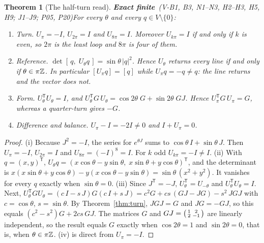 \documentclass[11pt,a4paper]{article}
\newcommand{\tp}{^{\mathsf T}}
\newcommand{\st}[1]{\textsf{\small\textbf{#1}}}
\newcommand{\Sfin}{\st{Exact finite}}\newcommand{\Sder}{\st{Exact derived}}
\theoremstyle{plain}
\newtheorem{thm}{Theorem}[section]
\theoremstyle{definition}
\theoremstyle{remark}
\begin{document}
\begin{thm}[The half-turn read]\Sfin\ \textit{(V-B1, B3, N1--N3, H2--H3, H5, H9; J1--J9; P05, P20)}\label{thm:endure}
For every $\theta$ and every $q\in V\setminus\{0\}$:
\begin{enumerate}[label=(\roman*),nosep]
\item \emph{Turn.} $U_\pi=-I$, $U_{2\pi}=I$ and $U_{8\pi}=I$. Moreover $U_{k\pi}=I$ if and only if $k$ is even, so $2\pi$ is the least loop and $8\pi$ is four of them.
\item \emph{Reference.} $\det[\,q,\;U_\theta q\,]=\sin\theta\,|q|^2$. Hence $U_\theta$ returns every line if and only if $\theta\in\pi\mathbb{Z}$. In particular $[U_\pi q]=[q]$ while $U_\pi q=-q\ne q$: the line returns and the vector does not.
\item \emph{Form.} $U_\theta\tp U_\theta=I$, and $U_\theta\tp G\,U_\theta=\cos2\theta\;G+\sin2\theta\;GJ$. Hence $U_\pi\tp G\,U_\pi=G$, whereas a quarter-turn gives $-G$.
\item \emph{Difference and balance.} $U_\pi-I=-2I\ne0$ and $I+U_\pi=0$.
\end{enumerate}
\end{thm}
\begin{proof}
(i) Because $J^2=-I$, the series for $e^{\theta J}$ sums to $\cos\theta\,I+\sin\theta\,J$. Then $U_\pi=-I$, $U_{2\pi}=I$ and $U_{8\pi}=(-I)^8=I$. For $k$ odd $U_{k\pi}=-I\ne I$. (ii) With $q=(x,y)\tp$, $U_\theta q=(x\cos\theta-y\sin\theta,\;x\sin\theta+y\cos\theta)\tp$, and the determinant is $x(x\sin\theta+y\cos\theta)-y(x\cos\theta-y\sin\theta)=\sin\theta\,(x^2+y^2)$. It vanishes for every $q$ exactly when $\sin\theta=0$. (iii) Since $J\tp=-J$, $U_\theta\tp=U_{-\theta}$ and $U_\theta\tp U_\theta=I$. Next, $U_\theta\tp GU_\theta=(c\,I-s\,J)G(c\,I+s\,J)=c^2G+cs\,(GJ-JG)-s^2\,JGJ$ with $c=\cos\theta$, $s=\sin\theta$. By Theorem~\ref{thm:turn}, $JGJ=G$ and $JG=-GJ$, so this equals $(c^2-s^2)G+2cs\,GJ$. The matrices $G$ and $GJ=\begin{psmallmatrix}1&2\\2&-1\end{psmallmatrix}$ are linearly independent, so the result equals $G$ exactly when $\cos2\theta=1$ and $\sin2\theta=0$, that is, when $\theta\in\pi\mathbb{Z}$. (iv) is direct from $U_\pi=-I$.
\end{proof}
\end{document}

